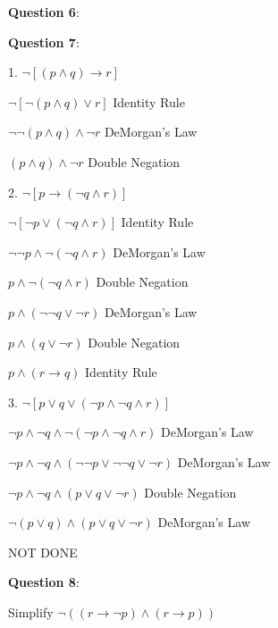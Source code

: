\documentclass{article} %
\newcommand{\question}[2][]{\begin{flushleft}
        \textbf{Question #1}: \textit{#2}

\end{flushleft}}
\begin{document}
    \question[6]{}

    \question[7]{}

        1. $\neg[(p \land q) \rightarrow r]$

        \tabto{0.98cm}$\neg[\neg(p \land q) \lor r]$ \tabto*{3.7cm} Identity Rule

        \tabto{0.98cm}$\neg \neg(p \land q) \land \neg r$ \tabto*{3.7cm} DeMorgan's Law

        \tabto{0.98cm}$(p \land q) \land \neg r$ \tabto*{3.7cm} Double Negation

        \hspace{0cm}

        2. $\neg[p \rightarrow (\neg q \land r)]$

        \tabto{0.98cm}$\neg[\neg p \lor (\neg q \land r)]$ \tabto*{3.7cm} Identity Rule

        \tabto{0.98cm}$\neg \neg p \land \neg (\neg q \land r)$ \tabto*{3.7cm} DeMorgan's Law

        \tabto{0.98cm}$p \land \neg (\neg q \land r)$ \tabto*{3.7cm} Double Negation

        \tabto{0.98cm}$p \land (\neg \neg q \lor \neg r)$ \tabto*{3.7cm} DeMorgan's Law

        \tabto{0.98cm}$p \land (q \lor \neg r)$ \tabto*{3.7cm} Double Negation

        \tabto{0.98cm}$p \land (r \rightarrow q)$ \tabto*{3.7cm} Identity Rule

        \hspace{0cm}

        3. $\neg[p \lor q \lor (\neg p \land \neg q \land r)]$

        \tabto{0.98cm}$\neg p \land \neg q \land \neg (\neg p \land \neg q \land r)$ \tabto*{5.4cm} DeMorgan's Law

        \tabto{0.98cm}$\neg p \land \neg q \land (\neg \neg p \lor \neg \neg q \lor \neg r)$ \tabto*{5.4cm} DeMorgan's Law

        \tabto{0.98cm}$\neg p \land \neg q \land (p \lor q \lor \neg r)$ \tabto*{5.4cm} Double Negation

        \tabto{0.98cm}$\neg (p \lor q) \land (p \lor q \lor \neg r)$ \tabto*{5.4cm} DeMorgan's Law

        \tabto{0.98cm} NOT DONE

    \question[8]{}

        Simplify $\neg ((r \rightarrow \neg p) \land (r \rightarrow p))$
\end{document}
